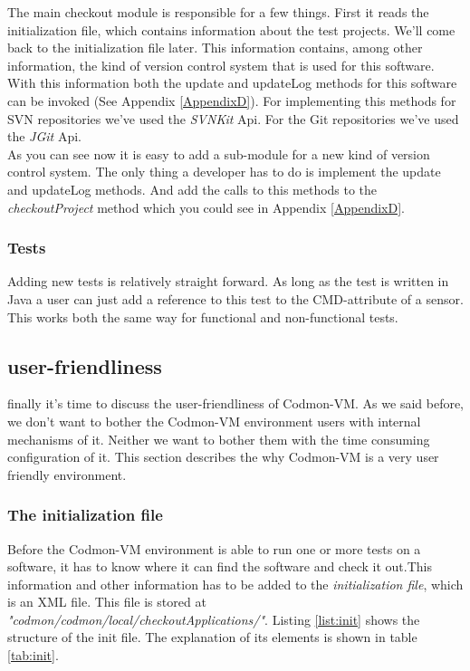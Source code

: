 \documentclass{article}
\newcommand{\project}{Codmon-VM}
\begin{document}
\noindent
The main checkout module is responsible for a few things. First it reads the initialization file, which contains information about the test projects. We'll come back to the initialization file later. This 
information contains, among other information, the kind of version control system that is used for this software. With this information both the update and updateLog methods for this software can be invoked (See 
Appendix \ref{AppendixD}). For implementing this methods for SVN repositories we've used the \emph{SVNKit} Api\cite{SVNKit}. For the Git repositories we've used the \emph{JGit} 
Api\cite{JGit}.\\

\noindent As you can see now it is easy to add a sub-module for a new kind of version control system. The only thing a developer has to do is implement the update and updateLog methods. And add the calls to
this methods to the \emph{checkoutProject} method which you could see in Appendix \ref{AppendixD}.
 

\subsubsection{Tests}
\label{imp:tests}
Adding new tests is relatively straight forward. As long as the test is written in Java a user can just add a reference to this test to the CMD-attribute of a sensor. This works both the same way for functional 
and non-functional tests.


\subsection{user-friendliness}
\label{imp-user}
finally it's time to discuss the user-friendliness of \project{}. As we said before, we don't want to bother the \project{} environment users with internal mechanisms of it. Neither we want to bother them with 
the time consuming configuration of it. This section describes the why \project{} is a very user friendly environment.\\

\subsubsection{The initialization file}
\label{imp:init}
\noindent Before the \project{} environment is able to run one or more tests on a software, it has to know where it can find the software and check it out.This information and other information has to be added to 
the \emph{initialization file}, which is an XML file. This file is stored at \emph{"codmon/codmon/local/checkoutApplications/"}. Listing \ref{list:init} shows the structure of the init file. The explanation 
of its elements is shown in table \ref{tab:init}. \\
\end{document}
